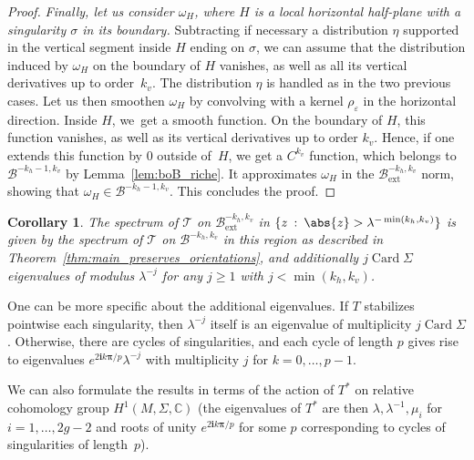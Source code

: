 \documentclass[10pt]{amsart}
\newcommand{\ext}{\mathrm{ext}}
\newcommand{\boB}{\mathcal{B}}
\newcommand{\boT}{\mathcal{T}}
\newcommand{\CC}{\mathbb{C}}
\newcommand{\ic}{\mathbf{i}}
\newcommand{\bpi}{\boldsymbol{\pi}}
\newcommand{\st}{\::\:}
\DeclareMathOperator{\Card}{Card}
\let\epsilon\varepsilon
\newtheorem{cor}[thm]{Corollary}
\theoremstyle{definition}
\numberwithin{equation}{section}
\begin{document}
\begin{proof}
\emph{Finally, let us consider $\omega_H$, where $H$ is a local horizontal
half-plane with a singularity $\sigma$ in its boundary.} Subtracting if
necessary a distribution $\eta$ supported in the vertical segment inside $H$
ending on $\sigma$, we can assume that the distribution induced by $\omega_H$
on the boundary of $H$ vanishes, as well as all its vertical derivatives up
to order~$k_v$. The distribution $\eta$ is handled as in the two previous
cases. Let us then smoothen $\omega_H$ by convolving with a kernel
$\rho_\epsilon$ in the horizontal direction. Inside $H$, we~get a smooth
function. On the boundary of $H$, this function vanishes, as well as its
vertical derivatives up to order $k_v$. Hence, if one extends this function
by $0$ outside of~$H$, we get a $C^{k_v}$ function, which belongs to
$\boB^{-k_h-1, k_v}$ by Lemma~\ref{lem:boB_riche}. It approximates $\omega_H$
in the $\boB_{\ext}^{-k_h, k_v}$ norm, showing that $\omega_H \in
\boB^{-k_h-1, k_v}$. This concludes the proof.
\end{proof}

\begin{cor}
\label{cor:spectrum_ext} The spectrum of $\boT$ on $\boB_{\ext}^{-k_h, k_v}$
in $\{z \st \abs{z}>\lambda^{-\min(k_h, k_v)}\}$ is given by the spectrum of
$\boT$ on $\boB^{-k_h, k_v}$ in this region as described in
Theorem~\ref{thm:main_preserves_orientations}, and additionally $j \Card
\Sigma$ eigenvalues of modulus $\lambda^{-j}$ for any $j\geq 1$ with
$j<\min(k_h, k_v)$.
\end{cor}
One can be more specific about the additional eigenvalues. If $T$ stabilizes
pointwise each singularity, then $\lambda^{-j}$ itself is an eigenvalue of
multiplicity $j\Card \Sigma$. Otherwise, there are cycles of singularities,
and each cycle of length $p$ gives rise to eigenvalues $e^{2\ic k\bpi/p}
\lambda^{-j}$ with multiplicity $j$ for $k=0,\dotsc, p-1$.

We can also formulate the results in terms of the action of $T^\ast$ on
relative cohomology group $H^1(M,\Sigma,\CC)$ (the eigenvalues of $T^\ast$ are
then $\lambda,\lambda^{-1},\mu_i$ for $i=1,\dots,2g-2$ and roots of unity
$e^{2\ic k\bpi/p}$ for some $p$ corresponding to cycles of singularities of
length~$p$).
\end{document}
